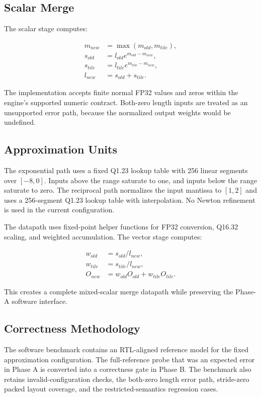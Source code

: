 \documentclass[conference]{IEEEtran}
\begin{document}
\subsection{Scalar Merge}

The scalar stage computes:

\begin{align}
m_{new} &= \max(m_{old}, m_{tile}), \\
s_{old} &= l_{old}e^{m_{old}-m_{new}}, \\
s_{tile} &= l_{tile}e^{m_{tile}-m_{new}}, \\
l_{new} &= s_{old} + s_{tile}.
\end{align}

The implementation accepts finite normal FP32 values and zeros within the
engine's supported numeric contract. Both-zero length inputs are treated as an
unsupported error path, because the normalized output weights would be
undefined.

\subsection{Approximation Units}

The exponential path uses a fixed Q1.23 lookup table with 256 linear segments
over $[-8,0]$. Inputs above the range saturate to one, and inputs below the
range saturate to zero. The reciprocal path normalizes the input mantissa to
$[1,2]$ and uses a 256-segment Q1.23 lookup table with interpolation. No
Newton refinement is used in the current configuration.

The datapath uses fixed-point helper functions for FP32 conversion, Q16.32
scaling, and weighted accumulation. The vector stage computes:

\begin{align}
w_{old} &= s_{old}/l_{new}, \\
w_{tile} &= s_{tile}/l_{new}, \\
O_{new} &= w_{old}O_{old} + w_{tile}O_{tile}.
\end{align}

This creates a complete mixed-scalar merge datapath while preserving the
Phase-A software interface.

\subsection{Correctness Methodology}

The software benchmark contains an RTL-aligned reference model for the fixed
approximation configuration. The full-reference probe that was an expected
error in Phase A is converted into a correctness gate in Phase B. The
benchmark also retains invalid-configuration checks, the both-zero length
error path, stride-zero packed layout coverage, and the restricted-semantics
regression cases.
\end{document}

